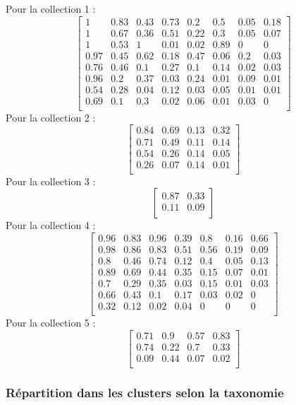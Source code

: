 \documentclass[
]{article}
\begin{document}
Pour la collection 1 :
\[\begin{bmatrix} 1 &0.83 &0.43 &0.73 &0.2 &0.5 &0.05 &0.18 \\1 &0.67 &0.36 &0.51 &0.22 &0.3 &0.05 &0.07 \\1 &0.53 &1 &0.01 &0.02 &0.89 &0 &0 \\0.97 &0.45 &0.62 &0.18 &0.47 &0.06 &0.2 &0.03 \\0.76 &0.46 &0.1 &0.27 &0.1 &0.14 &0.02 &0.03 \\0.96 &0.2 &0.37 &0.03 &0.24 &0.01 &0.09 &0.01 \\0.54 &0.28 &0.04 &0.12 &0.03 &0.05 &0.01 &0.01 \\0.69 &0.1 &0.3 &0.02 &0.06 &0.01 &0.03 &0 \\ \end{bmatrix}\]
Pour la collection 2 :
\[\begin{bmatrix} 0.84 &0.69 &0.13 &0.32 \\0.71 &0.49 &0.11 &0.14 \\0.54 &0.26 &0.14 &0.05 \\0.26 &0.07 &0.14 &0.01 \\ \end{bmatrix}\]
Pour la collection 3 :
\[\begin{bmatrix} 0.87 &0.33 \\0.11 &0.09 \\ \end{bmatrix}\] Pour la
collection 4 :
\[\begin{bmatrix} 0.96 &0.83 &0.96 &0.39 &0.8 &0.16 &0.66 \\0.98 &0.86 &0.83 &0.51 &0.56 &0.19 &0.09 \\0.8 &0.46 &0.74 &0.12 &0.4 &0.05 &0.13 \\0.89 &0.69 &0.44 &0.35 &0.15 &0.07 &0.01 \\0.7 &0.29 &0.35 &0.03 &0.15 &0.01 &0.03 \\0.66 &0.43 &0.1 &0.17 &0.03 &0.02 &0 \\0.32 &0.12 &0.02 &0.04 &0 &0 &0 \\ \end{bmatrix}\]
Pour la collection 5 :
\[\begin{bmatrix} 0.71 &0.9 &0.57 &0.83 \\0.74 &0.22 &0.7 &0.33 \\0.09 &0.44 &0.07 &0.02 \\ \end{bmatrix}\]

\hypertarget{ruxe9partition-dans-les-clusters-selon-la-taxonomie}{%
\subsubsection{Répartition dans les clusters selon la
taxonomie}\label{ruxe9partition-dans-les-clusters-selon-la-taxonomie}}
\end{document}
